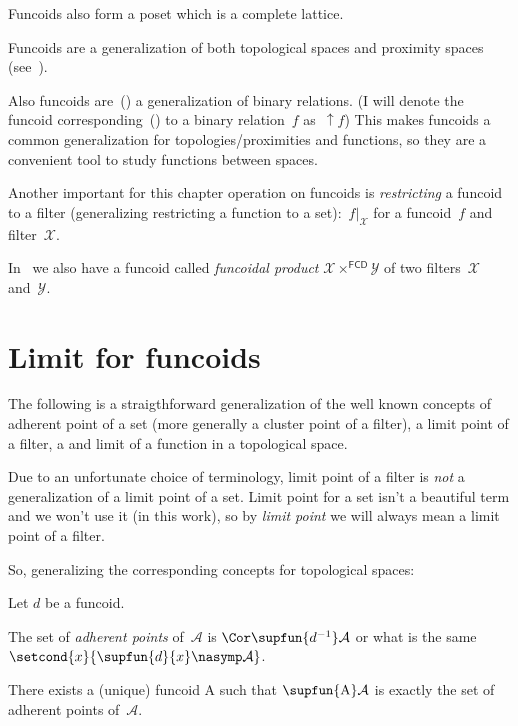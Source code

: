 Funcoids also form a poset which is a complete lattice.

Funcoids are a generalization of both topological spaces and proximity spaces (see~\cite{volume-1-edition1}).

Also funcoids are~(\cite{volume-1-edition1}) a generalization of binary relations. (I will denote the funcoid corresponding~(\cite{volume-1-edition1}) to a binary relation~$f$ as~$\uparrow f$) This makes funcoids a common generalization for topologies/proximities and functions, so they are a convenient tool to study functions between spaces.

Another important for this chapter operation on funcoids is \emph{restricting} a funcoid to a filter (generalizing restricting a function to a set):~$f|_{\mathcal{X}}$ for a funcoid~$f$ and filter~$\mathcal{X}$.

In~\cite{volume-1-edition1} we also have a funcoid called \emph{funcoidal product} $\mathcal{X}\times^{\mathsf{FCD}}\mathcal{Y}$ of two filters~$\mathcal{X}$ and~$\mathcal{Y}$.

\chapter{Limit for funcoids}

The following is a straigthforward generalization of the well known concepts of adherent point of a set (more generally a cluster point of a filter), a limit point of a filter, a and limit of a function in a
topological space.

\begin{note}
Due to an unfortunate choice of terminology, limit point of a filter is \emph{not} a generalization of a limit point of a set.
Limit point for a set isn't a beautiful term and we won't use it (in this work), so by \emph{limit point} we will always mean a limit point of a filter.
\end{note}

So, generalizing the corresponding concepts for topological spaces:

Let $d$ be a funcoid.

\begin{defn}
The set of \emph{adherent points} of~$\mathcal{A}$ is
$\Cor\supfun{d^{-1}}\mathcal{A}$ or what is the same
$\setcond{x}{\supfun{d}\{x\}\nasymp\mathcal{A}}$.
\end{defn}

\begin{prop}
There exists a (unique) funcoid $\mathrm{A}$ such that
$\supfun{\mathrm{A}}\mathcal{A}$ is exactly the set of adherent points of~$\mathcal{A}$.
\end{prop}

